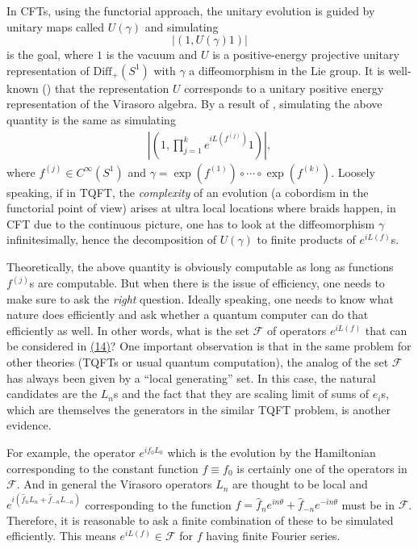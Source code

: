 \documentclass[twoside,11pt,titlepage]{amsart}
\renewcommand{\=}[1]{\stackrel{#1}{=}} %
\theoremstyle{definition}
\theoremstyle{remark}
\begin{document}
In CFTs, using the functorial approach, the unitary evolution is guided by unitary maps called $U(\gamma)$ and simulating
$$|(1,U(\gamma)1)|$$
is the goal, where $1$ is the vacuum and $U$ is a positive-energy projective unitary representation of $\text{Diff}_+(S^1)$ with $\gamma$ a diffeomorphism in the Lie group. It is well-known (\cite{goodman1985projective}) that the representation $U$ corresponds to a unitary positive energy representation of the Virasoro algebra. By a result of \cite{goodman1985projective}, simulating the above quantity is the same as simulating
\begin{align}\label{eq14}
|(1,\prod_{j=1}^k e^{iL(f^{(j)})}1)|,
\end{align}
where $f^{(j)} \in C^\infty(S^1)$ and $\gamma=\exp{(f^{(1)})} \circ \cdots \circ \exp{(f^{(k)})}$. Loosely speaking, if in TQFT, the \textit{complexity} of an evolution (a cobordism in the functorial point of view) arises at ultra local locations where braids happen, in CFT due to the continuous picture, one has to look at the diffeomorphism $\gamma$ infinitesimally, hence the decomposition of $U(\gamma)$ to finite products of $e^{iL(f)}$s.

Theoretically, the above quantity is obviously computable as long as functions $f^{(j)}$s are computable. But when there is the issue of efficiency, one needs to make sure to ask the \textit{right} question. Ideally speaking, one needs to know what nature does efficiently and ask whether a quantum computer can do that efficiently as well. In other words, what is the set $\mathcal{F}$ of operators $e^{iL(f)}$ that can be considered in \hyperref[eq14]{(14)}? One important observation is that in the same problem for other theories (TQFTs or usual quantum computation), the analog of the set $\mathcal{F}$ has always been given by a ``local generating'' set. In this case, the natural candidates are the $L_n$s and the fact that they are scaling limit of sums of $e_i$s, which are themselves the generators in the similar TQFT problem, is another evidence.

For example, the operator $e^{if_0L_0}$ which is the evolution by the Hamiltonian corresponding to the constant function $f \equiv f_0$ is certainly one of the operators in $\mathcal{F}$. And in general the Virasoro operators $L_n$ are thought to be local and $e^{i(\hat{f}_nL_n+\hat{f}_{-n}L_{-n})}$ corresponding to the function $f=\hat{f}_ne^{in\theta}+\hat{f}_{-n}e^{-in\theta}$ must be in $\mathcal{F}$. Therefore, it is reasonable to ask a finite combination of these to be simulated efficiently. This means $e^{iL(f)} \in \mathcal{F}$ for $f$ having finite Fourier series. 
\end{document}
